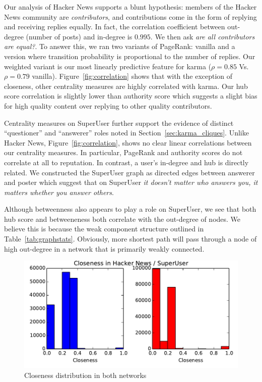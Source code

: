 \documentclass[11pt]{article}
\begin{document}
Our analysis of Hacker News supports a blunt hypothesis: members of the Hacker
News community are \textit{contributors}, and contributions come in the form of
replying and receiving replies equally. In fact, the correlation coefficient 
between out-degree (number of posts) and in-degree is $0.995$. We then ask
\textit{are all contributors are equal?}. To answer this, we ran two variants of PageRank: 
vanilla and a version where transition probability is proportional 
to the number of replies. Our weighted variant is our most linearly predictive
feature for karma ($\rho = 0.85$ Vs. $\rho=0.79$ vanilla).
Figure~\ref{fig:correlation} shows that with the exception
of closeness, other centrality measures are highly correlated with karma.
Our hub score correlation is slightly lower than authority score which suggests
a slight bias for high quality content over replying to other quality
contributors.

Centrality measures on SuperUser further support the evidence of distinct
``questioner'' and ``answerer'' roles noted in Section~\ref{sec:karma_cliques}.
Unlike Hacker News, Figure~\ref{fig:correlation}, shows no clear linear
correlations between our centrality measures. In particular, PageRank and
authority scores do not correlate at all to reputation. In contrast, a user's
in-degree and hub is directly related. We constructed the SuperUser graph as
directed edges between answerer and poster which suggest that on SuperUser
\textit{it doesn't matter who answers you, it matters whether you answer others}.

Although betweenness also appears to play a role on SuperUser, we see that
both hub score and betweeneness both correlate with the out-degree of nodes.
We believe this is because the weak component structure outlined in 
Table~\ref{tab:graphstats}. Obviously, more shortest path will pass through a
node of high out-degree in a network that is primarily weakly connected.

\begin{figure}[h]
\centering
\includegraphics[width=\linewidth]{closeness}
\caption{Closeness distribution in both networks}
\label{fig:closeness}
\end{figure}
\end{document}
